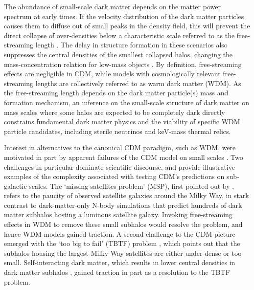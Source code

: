 The abundance of small-scale dark matter depends on the matter power spectrum at early times. If the velocity distribution of the dark matter particles causes them to diffuse out of small peaks in the density field, this will prevent the direct collapse of over-densities below a characteristic scale referred to as the free-streaming length \citep{Benson++13,Schneider++13}. The delay in structure formation in these scenarios also suppresses the central densities of the smallest collapsed halos, changing the mass-concentration relation for low-mass objects \citep{AvilaReese++01,Schneider++12,Maccio++13,Bose++16,Ludlow++16}. By definition, free-streaming effects are negligible in CDM, while models with cosmologically relevant free-streaming lengths are collectively referred to as warm dark matter (WDM). As the free-streaming length depends on the dark matter particle(s) mass and formation mechanism, an inference on the small-scale structure of dark matter on mass scales where some halos are expected to be completely dark directly constrains fundamental dark matter physics and the viability of specific WDM particle candidates, including sterile neutrinos \citep{Dodelson++94,ShiFuller99,AbazaijanKusenko19} and keV-mass thermal relics.  

Interest in alternatives to the canonical CDM paradigm, such as WDM, were motivated in part by apparent failures of the CDM model on small scales \citep[see][and references therein]{BullockBK17}. Two challenges in particular dominate scientific discourse, and provide illustrative examples of the complexity associated with testing CDM's predictions on sub-galactic scales. The `missing satellites problem' (MSP), first pointed out by \citet{Moore++99}, refers to the paucity of observed satellite galaxies around the Milky Way, in stark contrast to dark-matter-only N-body simulations that predict hundreds of dark matter subhalos hosting a luminous satellite galaxy. Invoking free-streaming effects in WDM to remove these small subhalos would resolve the problem, and hence WDM models gained traction. A second challenge to the CDM picture emerged with the `too big to fail' (TBTF) problem \citep{Boylan-Kolchin++11}, which points out that the subhalos housing the largest Milky Way satellites are either under-dense or too small. Self-interacting dark matter, which results in lower central densities in dark matter subhalos \citep[see][and references therein]{TulinYu18}, gained traction in part as a resolution to the TBTF problem. 

